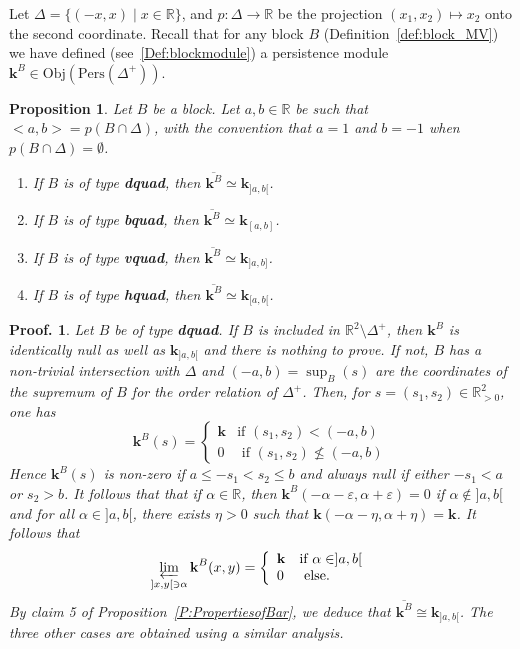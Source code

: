 \documentclass[a4paper, english, 11pt]{article}
\newcommand{\kk}[0]{\textbf{k}}
\newcommand{\Pe}{\text{Pers}}
\newcommand{\0}{\vec{0}}
\newcommand{\R}[0]{\mathbb{R}}
\newcommand{\Obj}[0]{\text{Obj}}
\newtheorem{prop}{Proposition}[section]
\newtheorem*{pf}{Proof.} }
\begin{document}
Let $\Delta = \{(-x,x)\mid x\in\R\}$, and $p : \Delta \longrightarrow \R$ be the projection $(x_1,x_2)\mapsto x_2$ onto the second coordinate. Recall that for any block $B$ (Definition~\ref{def:block_MV}) we have defined (see~\ref{Def:blockmodule}) a persistence module $\kk^B\in \Obj(\Pe(\Delta^+))$.
\begin{prop}\label{P:BarofBlock}
Let $B$ be a block. Let $a,b\in \R$ be such that $<a,b> = p(B\cap \Delta)$, with the convention that $a=1$ and $b=-1$ when $ p(B\cap \Delta) = \emptyset$.  
\begin{enumerate}
    \item If $B$ is of type \textbf{dquad}, then $\overline{\kk^B} \simeq \kk_{]a,b[}$.
    \item If $B$ is of type \textbf{bquad}, then $\overline{\kk^B} \simeq \kk_{[a,b]}$.
    \item If $B$ is of type \textbf{vquad}, then $\overline{\kk^B} \simeq \kk_{]a,b]}$.
    \item If $B$ is of type \textbf{hquad}, then $\overline{\kk^B} \simeq \kk_{[a,b[}$.
\end{enumerate}
\end{prop}
\begin{pf}
Let $B$ be of type \textbf{dquad}. If $B$ is included in $\mathbb{R}^2\setminus \Delta^+$, then $\kk^B$ is identically null as well as $\kk_{]a,b[}$ and there is nothing to prove. If not, $B$ has a non-trivial intersection with $\Delta$ and   $(-a,b)=\sup_{B}(s)$ are the coordinates of the supremum of $B$ for the order relation of $\Delta^+$. Then, for  $s=(s_1,s_2)\in \mathbb{R}^2_{>0}$, one has 
$$\kk^B(s) =\left\{ \begin{array}{ll} \kk & \mbox{if } (s_1,s_2)< (-a,b) \\
0 & \mbox{ if } (s_1, s_2) \not\leqslant (-a,b)\end{array}\right . $$ 
Hence $\kk^B(s)$ is non-zero  if $ a\leq -s_1 <s_2 \leq b$ and always null if either $-s_1<a$ or $s_2 >b$. It follows that 
that if $\alpha \in \mathbb{R}$, then $ \kk^B(-\alpha-\varepsilon, \alpha+\varepsilon) =0$ 
if $\alpha \notin ]a,b[$ and for all $\alpha \in ]a,b[$, there exists $\eta >0$ such that 
$\kk(-\alpha -\eta, \alpha+\eta) =\kk$. It follows that
\begin{equation}\varprojlim_{]x, y[ \ni \alpha} \kk^B(x,y) = \left\{ \begin{array}{ll} \kk & \mbox{if } \alpha \in ]a,b[ \\
0 & \mbox{ else. }\end{array}\right . 
 \end{equation}
By claim 5 of Proposition~\ref{P:PropertiesofBar}, we deduce that $\overline{\kk^B} \cong \kk_{]a,b[}$.
The three other cases are obtained using a similar analysis.
\end{pf}
\end{document}
